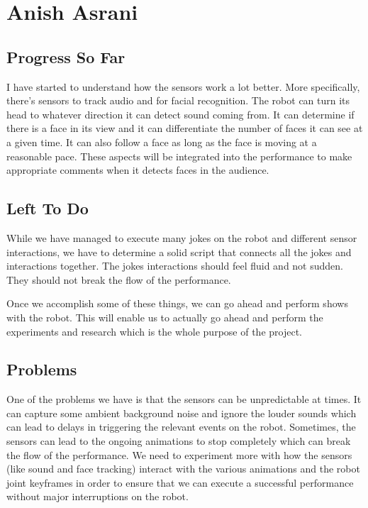 ﻿\documentclass[onecolumn, draftclsnofoot,10pt, compsoc]{IEEEtran}
\begin{document}
\section{Anish Asrani}

\subsection{Progress So Far}
I have started to understand how the sensors work a lot better. More specifically, there's sensors to track audio and for facial recognition. The robot can turn its head to whatever direction it can detect sound coming from. It can determine if there is a face in its view and it can differentiate the number of faces it can see at a given time. It can also follow a face as long as the face is moving at a reasonable pace. These aspects will be integrated into the performance to make appropriate comments when it detects faces in the audience.

\subsection{Left To Do}

While we have managed to execute many jokes on the robot and different sensor interactions, we have to determine a solid script that connects all the jokes and interactions together. The jokes interactions should feel fluid and not sudden. They should not break the flow of the performance.

Once we accomplish some of these things, we can go ahead and perform shows with the robot. This will enable us to actually go ahead and perform the experiments and research which is the whole purpose of the project.

\subsection{Problems}

One of the problems we have is that the sensors can be unpredictable at times. It can capture some ambient background noise and ignore the louder sounds which can lead to delays in triggering the relevant events on the robot. Sometimes, the sensors can lead to the ongoing animations to stop completely which can break the flow of the performance. We need to experiment more with how the sensors (like sound and face tracking) interact with the various animations and the robot joint keyframes in order to ensure that we can execute a successful performance without major interruptions on the robot.
\end{document}
